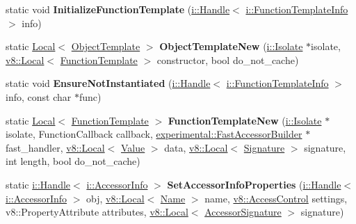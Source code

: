 \begin{DoxyCompactItemize}
\item 
static void {\bfseries Initialize\+Function\+Template} (\hyperlink{classv8_1_1internal_1_1_handle}{i\+::\+Handle}$<$ \hyperlink{classv8_1_1internal_1_1_function_template_info}{i\+::\+Function\+Template\+Info} $>$ info)\hypertarget{namespacev8_aeaca668454b23ef920593e5d2e3efc46}{}\label{namespacev8_aeaca668454b23ef920593e5d2e3efc46}

\item 
static \hyperlink{classv8_1_1_local}{Local}$<$ \hyperlink{classv8_1_1_object_template}{Object\+Template} $>$ {\bfseries Object\+Template\+New} (\hyperlink{classv8_1_1internal_1_1_isolate}{i\+::\+Isolate} $\ast$isolate, \hyperlink{classv8_1_1_local}{v8\+::\+Local}$<$ \hyperlink{classv8_1_1_function_template}{Function\+Template} $>$ constructor, bool do\+\_\+not\+\_\+cache)\hypertarget{namespacev8_a3a1a5fa489a5a53dd07029fa10a68d7e}{}\label{namespacev8_a3a1a5fa489a5a53dd07029fa10a68d7e}

\item 
static void {\bfseries Ensure\+Not\+Instantiated} (\hyperlink{classv8_1_1internal_1_1_handle}{i\+::\+Handle}$<$ \hyperlink{classv8_1_1internal_1_1_function_template_info}{i\+::\+Function\+Template\+Info} $>$ info, const char $\ast$func)\hypertarget{namespacev8_a63a573a1a9dc32acd298619022ab961b}{}\label{namespacev8_a63a573a1a9dc32acd298619022ab961b}

\item 
static \hyperlink{classv8_1_1_local}{Local}$<$ \hyperlink{classv8_1_1_function_template}{Function\+Template} $>$ {\bfseries Function\+Template\+New} (\hyperlink{classv8_1_1internal_1_1_isolate}{i\+::\+Isolate} $\ast$isolate, Function\+Callback callback, \hyperlink{classv8_1_1experimental_1_1_fast_accessor_builder}{experimental\+::\+Fast\+Accessor\+Builder} $\ast$fast\+\_\+handler, \hyperlink{classv8_1_1_local}{v8\+::\+Local}$<$ \hyperlink{classv8_1_1_value}{Value} $>$ data, \hyperlink{classv8_1_1_local}{v8\+::\+Local}$<$ \hyperlink{classv8_1_1_signature}{Signature} $>$ signature, int length, bool do\+\_\+not\+\_\+cache)\hypertarget{namespacev8_aed1b62dc5ea1b3685ca2eab3f041215d}{}\label{namespacev8_aed1b62dc5ea1b3685ca2eab3f041215d}

\item 
static \hyperlink{classv8_1_1internal_1_1_handle}{i\+::\+Handle}$<$ \hyperlink{classv8_1_1internal_1_1_accessor_info}{i\+::\+Accessor\+Info} $>$ {\bfseries Set\+Accessor\+Info\+Properties} (\hyperlink{classv8_1_1internal_1_1_handle}{i\+::\+Handle}$<$ \hyperlink{classv8_1_1internal_1_1_accessor_info}{i\+::\+Accessor\+Info} $>$ obj, \hyperlink{classv8_1_1_local}{v8\+::\+Local}$<$ \hyperlink{classv8_1_1_name}{Name} $>$ name, \hyperlink{namespacev8_a31d8355cb043d7d2dda3f4a52760b64e}{v8\+::\+Access\+Control} settings, v8\+::\+Property\+Attribute attributes, \hyperlink{classv8_1_1_local}{v8\+::\+Local}$<$ \hyperlink{classv8_1_1_accessor_signature}{Accessor\+Signature} $>$ signature)\hypertarget{namespacev8_aa6e876507dfa36e9930746cd89846463}{}\label{namespacev8_aa6e876507dfa36e9930746cd89846463}


\end{DoxyCompactItemize}
